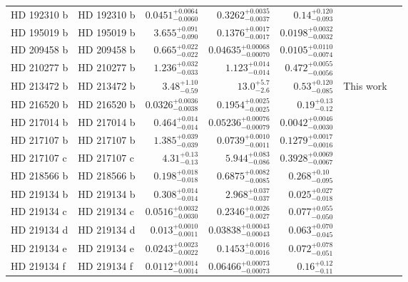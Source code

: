 \begin{longtable*}{llrrrrr}
HD 192310 b & HD 192310 b & $0.0451^{+0.0064}_{-0.0060}$ & $0.3262^{+0.0035}_{-0.0037}$ & $0.14^{+0.120}_{-0.093}$ & \cite{Howard11} & \\ 
HD 195019 b & HD 195019 b & $3.655^{+0.091}_{-0.090}$ & $0.1376^{+0.0017}_{-0.0017}$ & $0.0198^{+0.0032}_{-0.0032}$ & \cite{Fischer99} & \\ 
HD 209458 b & HD 209458 b & $0.665^{+0.022}_{-0.022}$ & $0.04635^{+0.00068}_{-0.00070}$ & $0.0105^{+0.0110}_{-0.0074}$ & \cite{Henry00} & \\ 
HD 210277 b & HD 210277 b & $1.236^{+0.032}_{-0.033}$ & $1.123^{+0.014}_{-0.014}$ & $0.472^{+0.0055}_{-0.0056}$ & \cite{Marcy99} & \\ 
HD 213472 b & HD 213472 b & $3.48^{+1.10}_{-0.59}$ & $13.0^{+5.7}_{-2.6}$ & $0.53^{+0.120}_{-0.085}$ & This work & \\ 
HD 216520 b & HD 216520 b & $0.0326^{+0.0036}_{-0.0038}$ & $0.1954^{+0.0025}_{-0.0025}$ & $0.19^{+0.13}_{-0.12}$ & \cite{Burt et al. in prep} & \\ 
HD 217014 b & HD 217014 b & $0.464^{+0.014}_{-0.014}$ & $0.05236^{+0.00076}_{-0.00079}$ & $0.0042^{+0.0046}_{-0.0030}$ & \cite{Mayor95} & \\ 
HD 217107 b & HD 217107 b & $1.385^{+0.039}_{-0.039}$ & $0.0739^{+0.0010}_{-0.0011}$ & $0.1279^{+0.0017}_{-0.0016}$ & \cite{Vogt05} & \\ 
HD 217107 c & HD 217107 c & $4.31^{+0.13}_{-0.13}$ & $5.944^{+0.083}_{-0.086}$ & $0.3928^{+0.0069}_{-0.0067}$ & \cite{Vogt05} & \\ 
HD 218566 b & HD 218566 b & $0.198^{+0.018}_{-0.018}$ & $0.6875^{+0.0082}_{-0.0085}$ & $0.268^{+0.10}_{-0.095}$ & \cite{Meschiari11} & \\ 
HD 219134 b & HD 219134 b & $0.308^{+0.014}_{-0.014}$ & $2.968^{+0.037}_{-0.037}$ & $0.025^{+0.027}_{-0.018}$ & \cite{Vogt15} & \\ 
HD 219134 c & HD 219134 c & $0.0516^{+0.0032}_{-0.0030}$ & $0.2346^{+0.0026}_{-0.0027}$ & $0.077^{+0.055}_{-0.050}$ & \cite{Vogt15} & \\ 
HD 219134 d & HD 219134 d & $0.013^{+0.0010}_{-0.0011}$ & $0.03838^{+0.00043}_{-0.00043}$ & $0.063^{+0.070}_{-0.045}$ & \cite{Vogt15} & \\ 
HD 219134 e & HD 219134 e & $0.0243^{+0.0023}_{-0.0022}$ & $0.1453^{+0.0016}_{-0.0016}$ & $0.072^{+0.078}_{-0.051}$ & \cite{Vogt15} & \\ 
HD 219134 f & HD 219134 f & $0.0112^{+0.0014}_{-0.0014}$ & $0.06466^{+0.00073}_{-0.00073}$ & $0.16^{+0.12}_{-0.11}$ & \cite{Vogt15} & \\ 

\end{longtable*}
